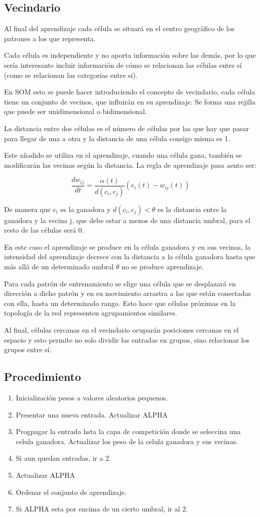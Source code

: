 \documentclass[12pt, twoside, openright]{report} %
\begin{document}
\subsection{Vecindario}
Al final del aprendizaje cada célula se situará en el centro geográfico de los patrones a los que representa.

Cada célula es independiente y no aporta información sobre las demás, por lo que sería interesante incluir información de cómo se relacionan las células entre sí (como se relacionan las categorías entre sí).

En SOM esto se puede hacer introduciendo el concepto de vecindario, cada célula tiene un conjunto de vecinos, que influirán en su aprendizaje. Se forma una rejilla que puede ser unidimensional o bidimensional.

La distancia entre dos células es el número de células por las que hay que pasar para llegar de una a otra y la distancia de una célula consigo misma es 1.

Este añadido se utiliza en el aprendizaje, cuando una célula gana, también se modificarán las vecinas según la distancia. La regla de aprendizaje pasa aento ser:

$$\frac{dw_{ij}}{dt}=\frac{\alpha(t)}{d(c_i, c_j)} (e_i(t)-w_{ij}(t))$$

De manera que $c_i$ es la ganadora y $d(c_i, c_j)<\theta$ es la distancia entre la ganadora y la vecina j, que debe estar a menos de una distancia umbral, para el resto de las células será 0.

En este caso el aprendizaje se produce en la célula ganadora y en sus vecinas, la intensidad del aprendizaje decrece con la distancia a la célula ganadora hasta que más allá de un determinado umbral $\theta$ no se produce aprendizaje.

Para cada patrón de entrenamiento se elige una célula que se desplazará en dirección a dicho patrón y en su movimiento arrastra a las que están conectadas con ella, hasta un determinado rango. Esto hace que células próximas en la topología de la red representen agrupamientos similares.

Al final, células cercanas en el vecindario ocuparán posiciones cercanas en el espacio y esto permite no solo dividir las entradas en grupos, sino relacionar los grupos entre sí.
\subsection{Procedimiento}
\begin{enumerate}
	\item Inicialización pesos a valores aleatorios pequenos.
	\item Presentar una nueva entrada. Actualizar ALPHA
	\item Progpagar la entrada hsta la capa de competición donde se seleccina una celula ganadora.
	\tem Actualizar los peso de la celula ganadora y sus vecinas.
	\item Si aun quedan entradas, ir a 2.
	\item Actualizar ALPHA
	\item Ordenar el conjunto de aprendizaje.
	\item Si ALPHA esta por encima de un cierto umbral, ir al 2.
\end{enumerate}
\end{document}
